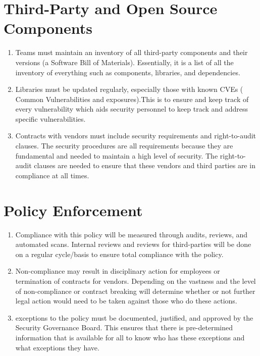 \section{Third-Party and Open Source Components}
\begin{enumerate}
    \item Teams must maintain an inventory of all third-party components and their versions (a Software Bill of Materials). Essentially, it is a list of all the inventory of everything such as components, libraries, and dependencies.
    \item Libraries must be updated regularly, especially those with known CVEs ( Common Vulnerabilities and exposures).This is to ensure and keep track of every vulnerability which aids security personnel to keep track and address specific vulnerabilities.
    \item Contracts with vendors must include security requirements and right-to-audit clauses. The security procedures are all requirements because they are fundamental and needed to maintain a high level of security. The right-to-audit clauses are needed to ensure that these vendors and third parties are in compliance at all times.
\end{enumerate}
\section{Policy Enforcement}
\begin{enumerate}
    \item Compliance with this policy will be measured through audits, reviews, and automated scans. Internal reviews and reviews for third-parties will be done on a regular cycle/basis to ensure total compliance with the policy.
    \item Non-compliance may result in disciplinary action for employees or termination of contracts for vendors. Depending on the vastness and the level of non-compliance or contract breaking will determine whether or not further legal action would need to be taken against those who do these actions.
    \item exceptions to the policy must be documented, justified, and approved by the Security Governance Board. This ensures that there is pre-determined information that is available for all to know who has these exceptions and what exceptions they have.
\end{enumerate}
